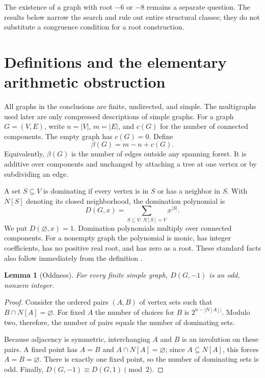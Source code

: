 \documentclass[11pt]{article}
\numberwithin{equation}{section}
\newtheorem{lemma}[theorem]{Lemma}
\theoremstyle{definition}
\begin{document}
The existence of a graph with root $-6$ or $-8$ remains a separate question.
The results below narrow the search and rule out entire structural classes;
they do not substitute a congruence condition for a root construction.

\section{Definitions and the elementary arithmetic obstruction}\label{cb:sec:definitions}

All graphs in the conclusions are finite, undirected, and simple. The
multigraphs used later are only compressed descriptions of simple graphs.
For a graph $G=(V,E)$, write $n=|V|$, $m=|E|$, and $c(G)$ for the number of
connected components. The empty graph has $c(G)=0$. Define
\[
 \beta(G)=m-n+c(G).
\]
Equivalently, $\beta(G)$ is the number of edges outside any spanning forest.
It is additive over components and unchanged by attaching a tree at one
vertex or by subdividing an edge.

A set $S\subseteq V$ is dominating if every vertex is in $S$ or has a
neighbor in $S$. With $N[S]$ denoting its closed neighborhood, the domination
polynomial is
\begin{equation}\label{cb:eq:domdef}
 D(G,x)=\sum_{S\subseteq V:\,N[S]=V}x^{|S|}.
\end{equation}
We put $D(\varnothing,x)=1$. Domination polynomials multiply over connected
components. For a nonempty graph the polynomial is monic, has integer
coefficients, has no positive real root, and has zero as a root. These
standard facts also follow immediately from the definition \cite{Intro}.

\begin{lemma}[Oddness]\label{cb:lem:odd}
For every finite simple graph, $D(G,-1)$ is an odd, nonzero integer.
\end{lemma}
\begin{proof}
Consider the ordered pairs $(A,B)$ of vertex sets such that
$B\cap N[A]=\varnothing$. For fixed $A$ the number of choices for $B$ is
$2^{n-|N[A]|}$. Modulo two, therefore, the number of pairs equals the
number of dominating sets.

Because adjacency is symmetric, interchanging $A$ and $B$ is an involution
on these pairs. A fixed point has $A=B$ and $A\cap N[A]=\varnothing$;
since $A\subseteq N[A]$, this forces $A=B=\varnothing$. There is exactly
one fixed point, so the number of dominating sets is odd. Finally,
$D(G,-1)\equiv D(G,1)\pmod2$.
\end{proof}
\end{document}
